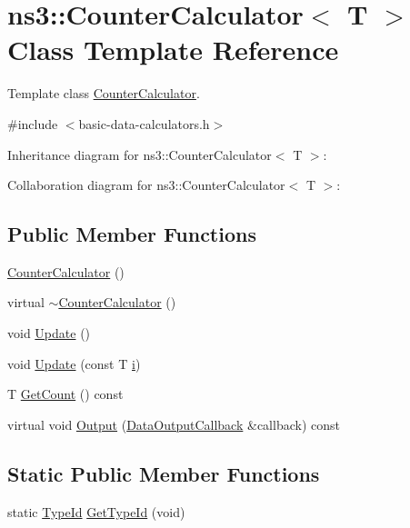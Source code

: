 \hypertarget{classns3_1_1CounterCalculator}{}\section{ns3\+:\+:Counter\+Calculator$<$ T $>$ Class Template Reference}
\label{classns3_1_1CounterCalculator}


Template class \hyperlink{classns3_1_1CounterCalculator}{Counter\+Calculator}.  




{\ttfamily \#include $<$basic-\/data-\/calculators.\+h$>$}



Inheritance diagram for ns3\+:\+:Counter\+Calculator$<$ T $>$\+:


Collaboration diagram for ns3\+:\+:Counter\+Calculator$<$ T $>$\+:
\subsection*{Public Member Functions}
\begin{DoxyCompactItemize}
\item 
\hyperlink{classns3_1_1CounterCalculator_a517ab110a7610257f3756f775c5e98c5}{Counter\+Calculator} ()
\item 
virtual \hyperlink{classns3_1_1CounterCalculator_aeea2d009eac6d065fd0efbb2f6b5fdab}{$\sim$\+Counter\+Calculator} ()
\item 
void \hyperlink{classns3_1_1CounterCalculator_adfbacf120e83c14e585a4a0ca84b59c9}{Update} ()
\item 
void \hyperlink{classns3_1_1CounterCalculator_a2dd6c0347d694fd470e552b53246caa7}{Update} (const T \hyperlink{lte__uplink__power__control_8m_a6f6ccfcf58b31cb6412107d9d5281426}{i})
\item 
T \hyperlink{classns3_1_1CounterCalculator_a54e49352d217603b2a5c5be8c23bc188}{Get\+Count} () const 
\item 
virtual void \hyperlink{classns3_1_1CounterCalculator_a4c07de9252e43d3d27daa0c05c909e1d}{Output} (\hyperlink{classns3_1_1DataOutputCallback}{Data\+Output\+Callback} \&callback) const 
\end{DoxyCompactItemize}
\subsection*{Static Public Member Functions}
\begin{DoxyCompactItemize}
\item 
static \hyperlink{classns3_1_1TypeId}{Type\+Id} \hyperlink{classns3_1_1CounterCalculator_a4781d9bd996353c763acd2ccdab16bdc}{Get\+Type\+Id} (void)
\end{DoxyCompactItemize}
